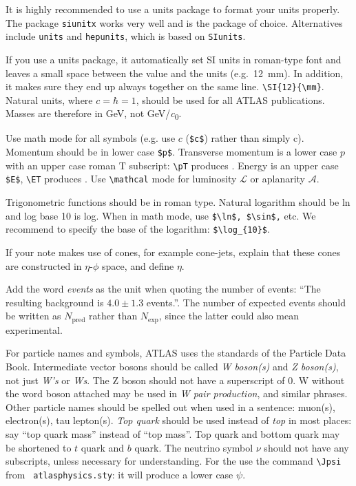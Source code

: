 \documentclass[UKenglish]{latex/atlasdoc}
\begin{document}
It is highly recommended to use a units package to format your units properly.
The package \texttt{siunitx} works very well and is the package of choice.
Alternatives include \texttt{units} and \texttt{hepunits},
which is based on \texttt{SIunits}.

If you use a units package, it automatically set SI units in roman-type font
and leaves a small space between
the value and the units (e.g.\ \SI{12}{\mm}). 
In addition, it makes sure they end up
always together on the same line. \verb|\SI{12}{\mm}|.
Natural units, where $c=\hbar=1$, should be used for all
ATLAS publications. Masses are therefore in \si{\GeV}, not \si[per-mode=symbol]{\GeV\per\clight}.

Use math mode for all symbols (e.g. use $c$ (\verb|$c$|) rather than simply c). 
Momentum should be in lower case \verb+$p$+. 
Transverse momentum is a lower case $p$ with an upper case roman $\text{T}$ subscript: 
\verb|\pT| produces \pT.
Energy is an upper case \verb+$E$+, \verb+\ET+ produces \ET.  
Use \verb|\mathcal| mode for luminosity $\mathcal{L}$ or aplanarity
$\mathcal{A}$.

Trigonometric functions should be in roman type. Natural logarithm
should be ln and log base 10 is log.  When in math mode, use
\verb+$\ln$, $\sin$,+ etc. We recommend to specify the base of the
logarithm: \verb+$\log_{10}$+.

If your note makes use of cones, for example cone-jets, explain that
these cones are constructed in $\eta$-$\phi$ space, and define $\eta$.

Add the word \emph{events} as the unit when quoting the number of
events: ``The resulting background is $4.0 \pm 1.3$ events.''.  The
number of expected events should be written as $N_{\text{pred}}$ rather
than $N_{\text{exp}}$, since the latter could also mean experimental.

For particle names and symbols, ATLAS uses the standards of the
Particle Data Book. Intermediate vector bosons should be called
\emph{W boson(s)} and \emph{Z boson(s)}, not just \emph{W's} or
\emph{Ws}. The Z boson should not have a superscript of 0. W without
the word boson attached may be used in \emph{W pair production}, and
similar phrases.  Other particle names should be spelled out when used
in a sentence: muon(s), electron(s), tau lepton(s). \emph{Top quark}
should be used instead of \emph{top} in most places: say ``top quark
mass'' instead of ``top mass''.  Top quark and bottom quark may be
shortened to $t$ quark and $b$ quark. The neutrino
symbol $\nu$ should not have any subscripts, unless necessary for
understanding. For the \Jpsi{} use the command \verb+\Jpsi+ from {\tt
atlasphysics.sty}: it will produce a lower case $\psi$.
\end{document}
